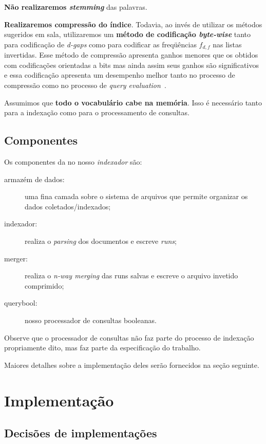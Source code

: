 \documentclass[10pt,twocolumn]{article}
\begin{document}
\textbf{Não realizaremos \emph{stemming}} das palavras.

\textbf{Realizaremos compressão do índice}. Todavia, ao invés de
utilizar os métodos sugeridos em sala, utilizaremos um \textbf{método de
codificação \emph{byte-wise}} tanto para codificação de \emph{d-gaps}
como para codificar as freqüências \(f_{d,f}\) nas listas invertidas.
Esse método de compressão apresenta ganhos menores que os obtidos com
codificações orientadas a bits mas ainda assim seus ganhos são
significativos e essa codificação apresenta um desempenho melhor tanto
no processo de compressão como no processo de \emph{query
evaluation}~\cite{zobel2002fastquery}.

Assumimos que \textbf{todo o vocabulário cabe na memória}. Isso é necessário
tanto para a indexação como para o processamento de consultas.

\subsection{Componentes}


Os componentes da no nosso \emph{indexador} são:
\begin{description}
\item[armazém de dados:] uma fina camada sobre o sistema de arquivos que
permite organizar os dados coletados/indexados;
\item[indexador:] realiza o \emph{parsing} dos documentos e escreve
\emph{runs};
\item[merger:] realiza o \emph{n-way merging} das runs salvas e escreve
o arquivo invetido comprimido;
\item[querybool:] nosso processador de consultas booleanas.
\end{description}


Observe que o processador de consultas não faz parte do processo de
indexação propriamente dito, mas faz parte da especificação do trabalho.

Maiores detalhes sobre a implementação deles serão fornecidos na seção
seguinte.


\section{Implementação}\label{sec:implementation}

\subsection{Decisões de implementações}
\end{document}
